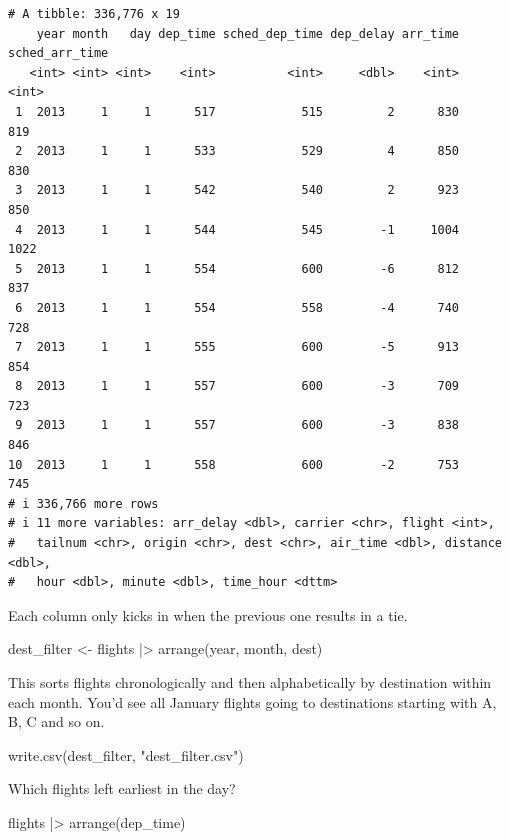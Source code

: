 \documentclass[
  letterpaper,
  DIV=11,
  numbers=noendperiod]{scrreprt}
\newenvironment{Shaded}{\begin{snugshade}}{\end{snugshade}}
\newcommand{\FunctionTok}[1]{\textcolor[rgb]{0.28,0.35,0.67}{#1}}
\newcommand{\NormalTok}[1]{\textcolor[rgb]{0.00,0.23,0.31}{#1}}
\newcommand{\OtherTok}[1]{\textcolor[rgb]{0.00,0.23,0.31}{#1}}
\newcommand{\SpecialCharTok}[1]{\textcolor[rgb]{0.37,0.37,0.37}{#1}}
\newcommand{\StringTok}[1]{\textcolor[rgb]{0.13,0.47,0.30}{#1}}
\begin{document}
\begin{verbatim}
# A tibble: 336,776 x 19
    year month   day dep_time sched_dep_time dep_delay arr_time sched_arr_time
   <int> <int> <int>    <int>          <int>     <dbl>    <int>          <int>
 1  2013     1     1      517            515         2      830            819
 2  2013     1     1      533            529         4      850            830
 3  2013     1     1      542            540         2      923            850
 4  2013     1     1      544            545        -1     1004           1022
 5  2013     1     1      554            600        -6      812            837
 6  2013     1     1      554            558        -4      740            728
 7  2013     1     1      555            600        -5      913            854
 8  2013     1     1      557            600        -3      709            723
 9  2013     1     1      557            600        -3      838            846
10  2013     1     1      558            600        -2      753            745
# i 336,766 more rows
# i 11 more variables: arr_delay <dbl>, carrier <chr>, flight <int>,
#   tailnum <chr>, origin <chr>, dest <chr>, air_time <dbl>, distance <dbl>,
#   hour <dbl>, minute <dbl>, time_hour <dttm>
\end{verbatim}

Each column only kicks in when the previous one results in a tie.

\begin{Shaded}
\begin{Highlighting}[]
\NormalTok{dest\_filter }\OtherTok{\textless{}{-}}\NormalTok{ flights }\SpecialCharTok{|\textgreater{}}
  \FunctionTok{arrange}\NormalTok{(year, month, dest)}
\end{Highlighting}
\end{Shaded}

This sorts flights chronologically and then alphabetically by
destination within each month. You'd see all January flights going to
destinations starting with A, B, C and so on.

\begin{Shaded}
\begin{Highlighting}[]
\FunctionTok{write.csv}\NormalTok{(dest\_filter, }\StringTok{"dest\_filter.csv"}\NormalTok{)}
\end{Highlighting}
\end{Shaded}

Which flights left earliest in the day?

\begin{Shaded}
\begin{Highlighting}[]
\NormalTok{flights }\SpecialCharTok{|\textgreater{}}
  \FunctionTok{arrange}\NormalTok{(dep\_time)}
\end{Highlighting}
\end{Shaded}
\end{document}

